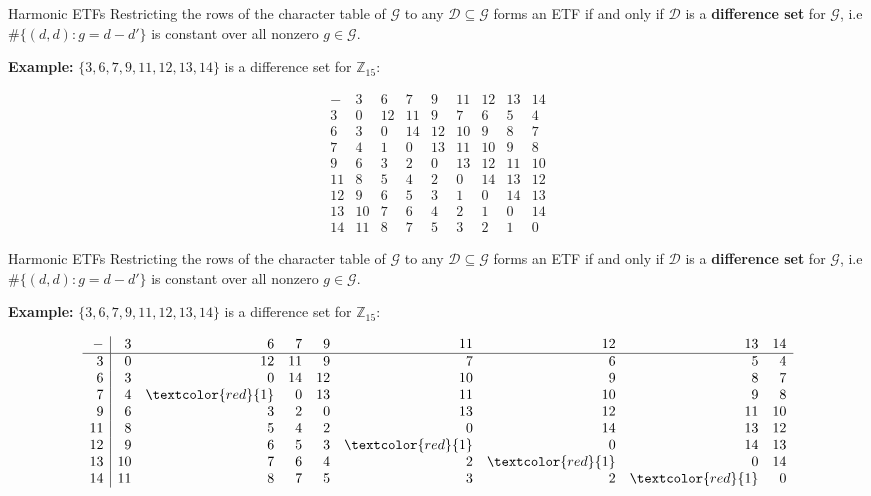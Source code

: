\documentclass[12pt]{beamer}
\newcommand{\bbZ}{\mathbb{Z}}
\newcommand{\calD}{\mathcal{D}}
\newcommand{\calG}{\mathcal{G}}
\begin{document}
\begin{frame}{Harmonic ETFs}
Restricting the rows of the character table of $\calG$ to any $\calD\subseteq\calG$ forms an ETF if and only if $\calD$ is a \textbf{difference set} for $\calG$, i.e $\#\{(d,d):g=d-d'\}$ is constant over all nonzero $g\in\calG$.

\vfill

\textbf{Example:}
$\{3,6,7,9,11,12,13,14\}$ is a difference set for $\bbZ_{15}$:

\footnotesize{
\begin{equation*}
\begin{array}{r|rrrrrrrr}
 -& 3& 6&7 & 9&11&12&13&14\\\hline
 3& 0&12&11& 9& 7& 6& 5& 4\\
 6& 3& 0&14&12&10& 9& 8& 7\\
 7& 4& 1& 0&13&11&10& 9& 8\\
 9& 6& 3& 2& 0&13&12&11&10\\
11& 8& 5& 4& 2& 0&14&13&12\\
12& 9& 6& 5& 3& 1& 0&14&13\\
13&10& 7& 6& 4& 2& 1& 0&14\\
14&11& 8& 7& 5& 3& 2& 1& 0
\end{array}
\end{equation*}
}

\end{frame}

\begin{frame}[noframenumbering]{Harmonic ETFs}
Restricting the rows of the character table of $\calG$ to any $\calD\subseteq\calG$ forms an ETF if and only if $\calD$ is a \textbf{difference set} for $\calG$, i.e $\#\{(d,d):g=d-d'\}$ is constant over all nonzero $g\in\calG$.

\vfill

\textbf{Example:}
$\{3,6,7,9,11,12,13,14\}$ is a difference set for $\bbZ_{15}$:

\footnotesize{
\begin{equation*}
\begin{array}{r|rrrrrrrr}
 -& 3& 6&7 & 9&11&12&13&14\\\hline
 3& 0&12&11& 9& 7& 6& 5& 4\\
 6& 3& 0&14&12&10& 9& 8& 7\\
 7& 4& \textcolor{red}{1} & 0&13&11&10& 9& 8\\
 9& 6& 3& 2& 0&13&12&11&10\\
11& 8& 5& 4& 2& 0&14&13&12\\
12& 9& 6& 5& 3& \textcolor{red}{1}& 0&14&13\\
13&10& 7& 6& 4& 2& \textcolor{red}{1}& 0&14\\
14&11& 8& 7& 5& 3& 2& \textcolor{red}{1}& 0
\end{array}
\end{equation*}
}

\end{frame}
\end{document}
